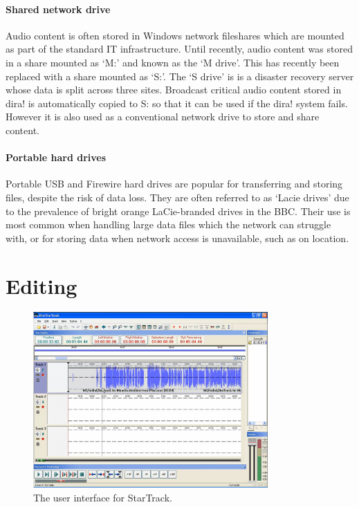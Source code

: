 \paragraph{Shared network drive}
Audio content is often stored in Windows network fileshares which are mounted
as part of the standard IT infrastructure. Until recently, audio content was
stored in a share mounted as `M:' and known as the `M drive'. This has recently
been replaced with a share mounted as `S:'. The `S drive' is is a disaster
recovery server whose data is split across three sites. Broadcast critical
audio content stored in dira! is automatically copied to S: so that it can be
used if the dira! system fails. However it is also used as a conventional
network drive to store and share content.

\paragraph{Portable hard drives}
Portable USB and Firewire hard drives are popular for transferring and storing
files, despite the risk of data loss. They are often referred to as `Lacie
drives' due to the prevalence of bright orange LaCie-branded drives in the BBC.
Their use is most common when handling large data files which the network can
struggle with, or for storing data when network access is unavailable, such as
on location.

\section{Editing}

\begin{figure}[p]
\centering
\includegraphics[width=0.8\textwidth]{figs/startrack.png}
\caption{The user interface for StarTrack.}
\label{fig:startrack}
\end{figure}

